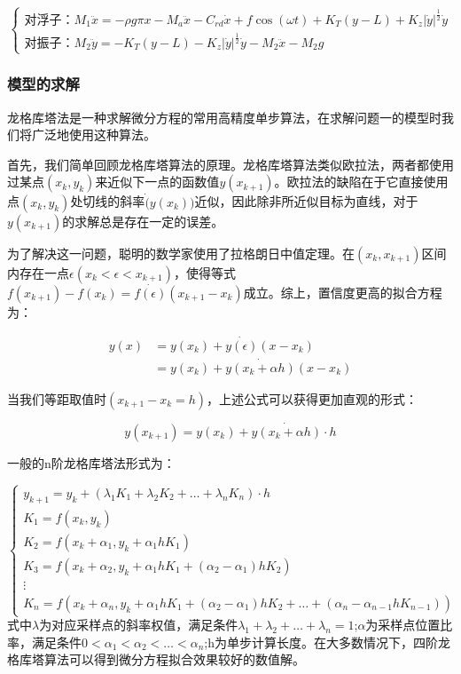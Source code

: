 \documentclass[12pt,utf8]{article}
\begin{document}
\begin{equation}
	\begin{cases}
		\text{对浮子：}M_1 \ddot{x} = - \rho g \pi x - M_a\ddot{x} - C_{rd}\dot{x} + f\cos (\omega t)  + K_T(y-L)+K_z |\dot{y}|^{\frac{1}{2}} \dot{y} \\
		\text{对振子：}M_2 \ddot{y} = -K_T (y-L)-K_z|\dot{y}|^{\frac{1}{2}} \dot{y}-M_2\ddot{x}-M_2 g
	\end{cases}
\end{equation}

\subsubsection{模型的求解}

龙格库塔法是一种求解微分方程的常用高精度单步算法，在求解问题一的模型时我们将广泛地使用这种算法。

首先，我们简单回顾龙格库塔算法的原理。龙格库塔算法类似欧拉法，两者都使用过某点$(x_k,y_k)$来近似下一点的函数值$y(x_{k+1})$。欧拉法的缺陷在于它直接使用点$(x_k,y_k)$处切线的斜率$\dot(y(x_k))$近似，因此除非所近似目标为直线，对于$y(x_{k+1})$的求解总是存在一定的误差。

为了解决这一问题，聪明的数学家使用了拉格朗日中值定理。在$(x_k,x_{k+1})$区间内存在一点$\epsilon (x_k < \epsilon < x_{k+1})$，使得等式$f(x_{k+1})-f(x_k) = \dot{f(\epsilon)}(x_{k+1}-x_k)$成立。综上，置信度更高的拟合方程为：

$$
\begin{aligned}
	y(x)&=y(x_k)+\dot{y(\epsilon)}(x-x_k) \\
	&=y(x_k)+\dot{y(x_k+\alpha h)}(x-x_k)
\end{aligned}
$$

当我们等距取值时$(x_{k+1}-x_k = h)$，上述公式可以获得更加直观的形式：

$$
	y(x_{k+1}) = y(x_k)+\dot{y(x_k+\alpha h)}\cdot h
$$

一般的n阶龙格库塔法形式为：

\begin{equation*}
	\begin{cases}
		y_{k+1} = y_k+(\lambda_1 K_1 + \lambda_2 K_2+ \dots +\lambda_n K_n)\cdot h \\
		K_1 = f(x_k,y_k) \\
		K_2 = f(x_k+\alpha_1,y_k+\alpha_1 h K_1) \\
		K_3 = f(x_k+\alpha_2,y_k+\alpha_1 h K_1 + (\alpha_2 - \alpha_1)h K_2) \\
		\vdots \\
		K_n = f(x_k+\alpha_n,y_k+\alpha_1 h K_1 + (\alpha_2 - \alpha_1)h K_2+\dots +(\alpha_n - \alpha_{n-1}h K_{n-1}))
	\end{cases}
\end{equation*}
式中$\lambda$为对应采样点的斜率权值，满足条件$\lambda_1+\lambda_2+\dots +\lambda_n = 1$;$\alpha$为采样点位置比率，满足条件$0<\alpha_1<\alpha_2<\dots<\alpha_n$;h为单步计算长度。在大多数情况下，四阶龙格库塔算法可以得到微分方程拟合效果较好的数值解。
\end{document}
